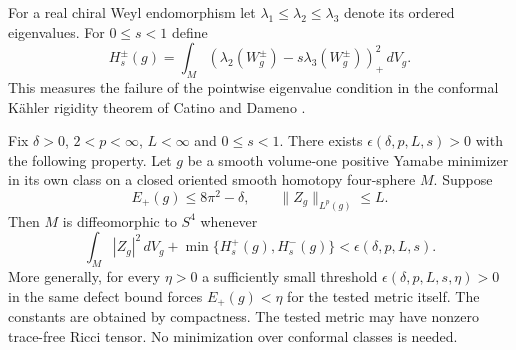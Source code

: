 For a real chiral Weyl endomorphism let \(\lambda_1\le\lambda_2\le
\lambda_3\) denote its ordered eigenvalues. For \(0\le s<1\) define
\[
 H_s^\pm(g)=\int_M
    (\lambda_2(W^\pm_g)-s\lambda_3(W^\pm_g))_+^2\,dV_g .
\]
This measures the failure of the pointwise eigenvalue condition in the
conformal K\"ahler rigidity theorem of Catino and Dameno
\cite[Theorem 1.4]{CatinoDameno2026ConformalKahler}.

\begin{theorem}
\label{thm:near-einstein-recognition}\label{prop:ein}
Fix \(\delta>0\), \(2<p<\infty\), \(L<\infty\) and \(0\le s<1\).
There exists \(\epsilon(\delta,p,L,s)>0\) with the following property.
Let \(g\) be a smooth volume-one positive Yamabe minimizer in its own
class on a closed oriented smooth homotopy four-sphere \(M\). Suppose
\[
 E_+(g)\le8\pi^2-\delta,\qquad \|Z_g\|_{L^p(g)}\le L .
\]
Then \(M\) is diffeomorphic to \(S^4\) whenever
\[
 \int_M|Z_g|^2\,dV_g+\min\{H_s^+(g),H_s^-(g)\}<\epsilon(\delta,p,L,s).
\]
More generally, for every \(\eta>0\) a sufficiently small threshold
\(\epsilon(\delta,p,L,s,\eta)>0\) in the same defect bound forces
\(E_+(g)<\eta\) for the tested metric itself. The constants are
obtained by compactness. The tested metric may have
nonzero trace-free Ricci tensor. No minimization over conformal classes
is needed.
\end{theorem}

